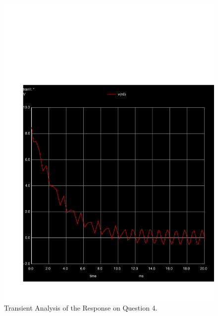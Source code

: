 \begin{figure}[H] \centering
\includegraphics[width=0.7\linewidth]{../sim/transient4r.pdf}
\caption{Transient Analysis of the Response on Question 4.}
\label{fig:transient4r}
\end{figure}

